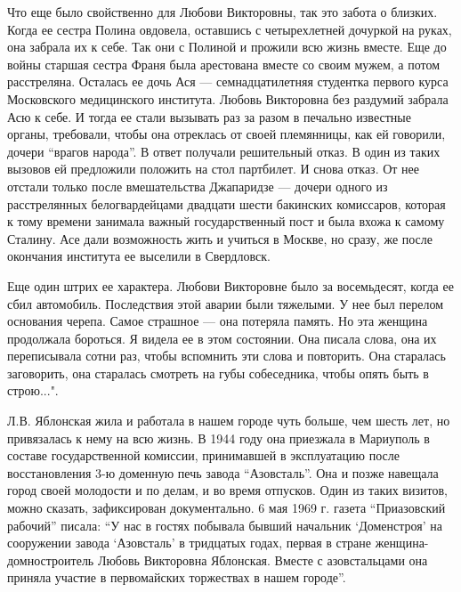 Что еще было свойственно для Любови Викторовны, так это забота о близких. Когда
ее сестра Полина овдовела, оставшись с четырехлетней дочуркой на руках, она
забрала их к себе. Так они с Полиной и прожили всю жизнь вместе. Еще до войны
старшая сестра Франя была арестована вместе со своим мужем, а потом
расстреляна. Осталась ее дочь Ася — семнадцатилетняя студентка первого курса
Московского медицинского института. Любовь Викторовна без раздумий забрала Асю
к себе. И тогда ее стали вызывать раз за разом в печально известные органы,
требовали, чтобы она отреклась от своей племянницы, как ей говорили, дочери
\enquote{врагов народа}. В ответ получали решительный отказ. В один из таких вызовов ей
предложили положить на стол партбилет. И снова отказ. От нее отстали только
после вмешательства Джапаридзе — дочери одного из расстрелянных белогвардейцами
двадцати шести бакинских комиссаров, которая к тому времени занимала важный
государственный пост и была вхожа к самому Сталину. Асе дали возможность жить и
учиться в Москве, но сразу, же после окончания института ее выселили в
Свердловск.

Еще один штрих ее характера. Любови Викторовне было за восемьдесят, когда ее
сбил автомобиль. Последствия этой аварии были тяжелыми. У нее был перелом
основания черепа. Самое страшное — она потеряла память. Но эта женщина
продолжала бороться. Я видела ее в этом состоянии. Она писала слова, она их
переписывала сотни раз, чтобы вспомнить эти слова и повторить. Она старалась
заговорить, она старалась смотреть на губы собеседника, чтобы опять быть в
строю...".

Л.В. Яблонская жила и работала в нашем городе чуть больше, чем шесть лет, но
привязалась к нему на всю жизнь. В 1944 году она приезжала в Мариуполь в
составе государственной комиссии, принимавшей в эксплуатацию после
восстановления 3-ю доменную печь завода \enquote{Азовсталь}. Она и позже навещала город
своей молодости и по делам, и во время отпусков. Один из таких визитов, можно
сказать, зафиксирован документально. 6 мая 1969 г. газета \enquote{Приазовский рабочий}
писала: \enquote{У нас в гостях побывала бывший начальник \enquote{Доменстроя} на сооружении
завода \enquote{Азовсталь} в тридцатых годах, первая в стране женщина-домностроитель
Любовь Викторовна Яблонская. Вместе с азовстальцами она приняла участие в
первомайских торжествах в нашем городе}.
